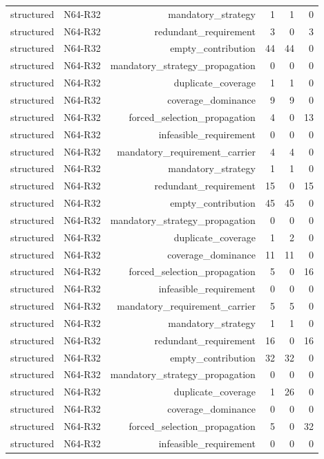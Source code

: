{\begin{longtable}{lrrrrr}
structured & N64-R32 & mandatory\_strategy & 1 & 1 & 0 \\
structured & N64-R32 & redundant\_requirement & 3 & 0 & 3 \\
structured & N64-R32 & empty\_contribution & 44 & 44 & 0 \\
structured & N64-R32 & mandatory\_strategy\_propagation & 0 & 0 & 0 \\
structured & N64-R32 & duplicate\_coverage & 1 & 1 & 0 \\
structured & N64-R32 & coverage\_dominance & 9 & 9 & 0 \\
structured & N64-R32 & forced\_selection\_propagation & 4 & 0 & 13 \\
structured & N64-R32 & infeasible\_requirement & 0 & 0 & 0 \\
structured & N64-R32 & mandatory\_requirement\_carrier & 4 & 4 & 0 \\
structured & N64-R32 & mandatory\_strategy & 1 & 1 & 0 \\
structured & N64-R32 & redundant\_requirement & 15 & 0 & 15 \\
structured & N64-R32 & empty\_contribution & 45 & 45 & 0 \\
structured & N64-R32 & mandatory\_strategy\_propagation & 0 & 0 & 0 \\
structured & N64-R32 & duplicate\_coverage & 1 & 2 & 0 \\
structured & N64-R32 & coverage\_dominance & 11 & 11 & 0 \\
structured & N64-R32 & forced\_selection\_propagation & 5 & 0 & 16 \\
structured & N64-R32 & infeasible\_requirement & 0 & 0 & 0 \\
structured & N64-R32 & mandatory\_requirement\_carrier & 5 & 5 & 0 \\
structured & N64-R32 & mandatory\_strategy & 1 & 1 & 0 \\
structured & N64-R32 & redundant\_requirement & 16 & 0 & 16 \\
structured & N64-R32 & empty\_contribution & 32 & 32 & 0 \\
structured & N64-R32 & mandatory\_strategy\_propagation & 0 & 0 & 0 \\
structured & N64-R32 & duplicate\_coverage & 1 & 26 & 0 \\
structured & N64-R32 & coverage\_dominance & 0 & 0 & 0 \\
structured & N64-R32 & forced\_selection\_propagation & 5 & 0 & 32 \\
structured & N64-R32 & infeasible\_requirement & 0 & 0 & 0 \\

\end{longtable}}
